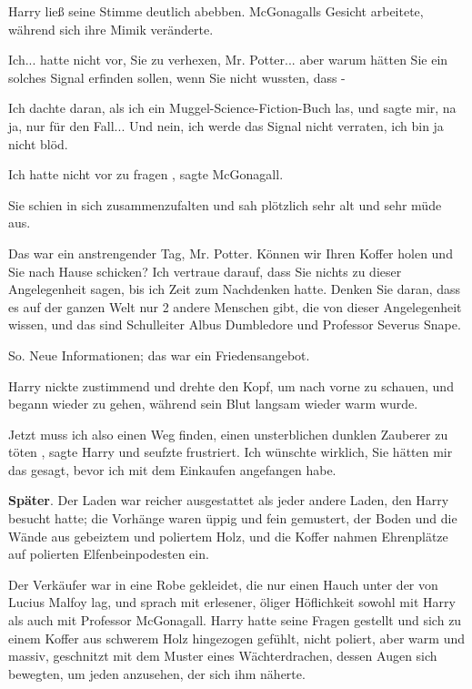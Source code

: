 Harry ließ seine Stimme deutlich abebben. McGonagalls Gesicht arbeitete, während
sich ihre Mimik veränderte.

\glqq Ich... hatte nicht vor, Sie zu verhexen, Mr. Potter... aber warum hätten
Sie ein solches Signal erfinden sollen, wenn Sie nicht wussten, dass
-\grqq{}

\glqq Ich dachte daran, als ich ein Muggel-Science-Fiction-Buch las, und sagte
mir, na ja, nur für den Fall... Und nein, ich werde das Signal nicht
verraten, ich bin ja nicht blöd.\grqq{}

\glqq Ich hatte nicht vor zu fragen\grqq{} , sagte McGonagall.

Sie schien in sich zusammenzufalten und sah plötzlich sehr alt und sehr müde
aus.

\glqq Das war ein anstrengender Tag, Mr. Potter. Können wir Ihren Koffer holen
und Sie nach Hause schicken? Ich vertraue darauf, dass Sie nichts zu dieser
Angelegenheit sagen, bis ich Zeit zum Nachdenken hatte. Denken Sie daran,
dass es auf der ganzen Welt nur 2 andere Menschen gibt, die von dieser
Angelegenheit wissen, und das sind Schulleiter Albus Dumbledore und
Professor Severus Snape.\grqq{}

So. Neue Informationen; das war ein Friedensangebot.

Harry nickte zustimmend und drehte den Kopf, um nach vorne zu schauen, und
begann wieder zu gehen, während sein Blut langsam wieder warm wurde.

\glqq Jetzt muss ich also einen Weg finden, einen unsterblichen dunklen Zauberer
zu töten\grqq{} , sagte Harry und seufzte frustriert. \glqq Ich wünschte
wirklich, Sie hätten mir das gesagt, bevor ich mit dem Einkaufen angefangen
habe.\grqq{}

\textbf{Später}. Der Laden war reicher ausgestattet als jeder andere
Laden, den Harry besucht hatte; die Vorhänge waren üppig und fein gemustert, der
Boden und die Wände aus gebeiztem und poliertem Holz, und die Koffer nahmen
Ehrenplätze auf polierten Elfenbeinpodesten ein.

Der Verkäufer war in eine Robe gekleidet, die nur einen Hauch unter der von
Lucius Malfoy lag, und sprach mit erlesener, öliger Höflichkeit sowohl mit
Harry als auch mit Professor McGonagall. Harry hatte seine Fragen gestellt
und sich zu einem Koffer aus schwerem Holz hingezogen gefühlt, nicht
poliert, aber warm und massiv, geschnitzt mit dem Muster eines
Wächterdrachen, dessen Augen sich bewegten, um jeden anzusehen, der sich ihm
näherte.


